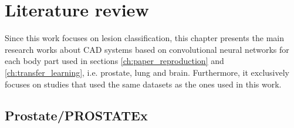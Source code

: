 
\chapter{Literature review}
\label{ch:literature_review}

\setlength{\marginparwidth}{3cm}\leavevmode {}Since this work focuses on lesion classification, this chapter presents the main research works about CAD systems based on convolutional neural networks for each body part used in sections \ref{ch:paper_reproduction} and \ref{ch:transfer_learning}, i.e. prostate, lung and brain. Furthermore, it exclusively focuses on studies that used the same datasets as the ones used in this work.

\section{Prostate/PROSTATEx}

